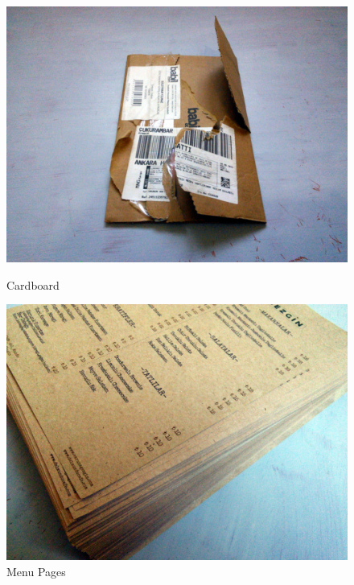 \begin{figure}[!tbp]
  \centering
  \begin{minipage}[b]{0.48\textwidth}
    \includegraphics[width=\textwidth]{project_graphics/collected_cardboard.jpg}
    \caption{Cardboard}
    \label{fig:CardBoard}
  \end{minipage}
  \hfill
  \begin{minipage}[b]{0.48\textwidth}
    \includegraphics[width=\textwidth]{project_graphics/collected_varuna_gezgin.jpg}
    \caption{Menu Pages}
    \label{fig:VarunaGezgin}
  \end{minipage}
\end{figure}


